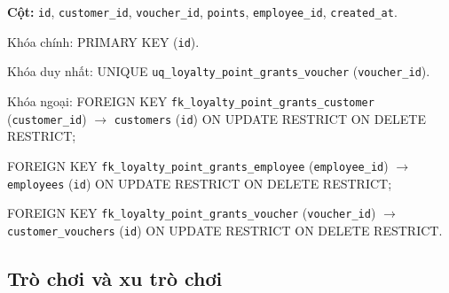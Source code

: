 \begin{description}[leftmargin=3.6cm,labelwidth=3.4cm,style=nextline]
\item[\texttt{loyalty\_point\_grants}] \textbf{Cột:} \texttt{id}, \texttt{customer\_id}, \texttt{voucher\_id}, \texttt{points}, \texttt{employee\_id}, \texttt{created\_at}.

Khóa chính: PRIMARY KEY (\texttt{id}).

Khóa duy nhất: UNIQUE \texttt{uq\_loyalty\_point\_grants\_voucher} (\texttt{voucher\_id}).

Khóa ngoại: FOREIGN KEY \texttt{fk\_loyalty\_point\_grants\_customer} (\texttt{customer\_id}) $\rightarrow$ \texttt{customers} (\texttt{id}) ON UPDATE RESTRICT ON DELETE RESTRICT;\par FOREIGN KEY \texttt{fk\_loyalty\_point\_grants\_employee} (\texttt{employee\_id}) $\rightarrow$ \texttt{employees} (\texttt{id}) ON UPDATE RESTRICT ON DELETE RESTRICT;\par FOREIGN KEY \texttt{fk\_loyalty\_point\_grants\_voucher} (\texttt{voucher\_id}) $\rightarrow$ \texttt{customer\_vouchers} (\texttt{id}) ON UPDATE RESTRICT ON DELETE RESTRICT.

\end{description}

\subsection{Trò chơi và xu trò chơi}

